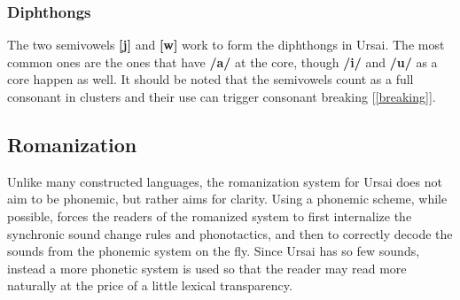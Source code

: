 \documentclass[11pt,letterpaper]{article}
\begin{document}
		\subsubsection{Diphthongs}
		The two semivowels \textbf{[j]} and \textbf{[w]} work to form the diphthongs in Ursai.  The most common ones are the ones that have \textbf{/a/} at the core, though \textbf{/i/} and \textbf{/u/} as a core happen as well.  It should be noted that the semivowels count as a full consonant in clusters and their use can trigger consonant breaking [\ref{breaking}]. 
	\subsection{Romanization}
		\par 
		Unlike many constructed languages, the romanization system for Ursai does not aim to be phonemic, but rather aims for clarity.  Using a phonemic scheme, while possible, forces the readers of the romanized system to first internalize the synchronic sound change rules and phonotactics, and then to correctly decode the sounds from the phonemic system on the fly.  Since Ursai has so few sounds, instead a more phonetic system is used so that the reader may read more naturally at the price of a little lexical transparency.
\end{document}
